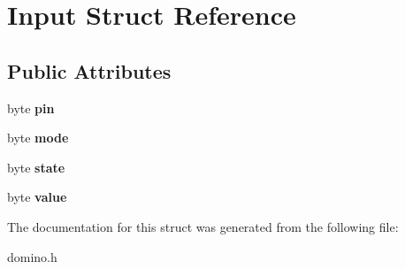 \hypertarget{struct_input}{}\section{Input Struct Reference}
\label{struct_input}
\subsection*{Public Attributes}
\begin{DoxyCompactItemize}
\item 
\hypertarget{struct_input_a30d7c88958e6de24d47e6228e92f87a6}{}byte {\bfseries pin}\label{struct_input_a30d7c88958e6de24d47e6228e92f87a6}

\item 
\hypertarget{struct_input_a1044689857e05ef77ac3ff4fda217c2c}{}byte {\bfseries mode}\label{struct_input_a1044689857e05ef77ac3ff4fda217c2c}

\item 
\hypertarget{struct_input_ad2a5f6ec587d6299bea8f46dcedf696e}{}byte {\bfseries state}\label{struct_input_ad2a5f6ec587d6299bea8f46dcedf696e}

\item 
\hypertarget{struct_input_a431501600a3bf12fef5da56a4bbac6b2}{}byte {\bfseries value}\label{struct_input_a431501600a3bf12fef5da56a4bbac6b2}

\end{DoxyCompactItemize}


The documentation for this struct was generated from the following file\+:\begin{DoxyCompactItemize}
\item 
domino.\+h\end{DoxyCompactItemize}
